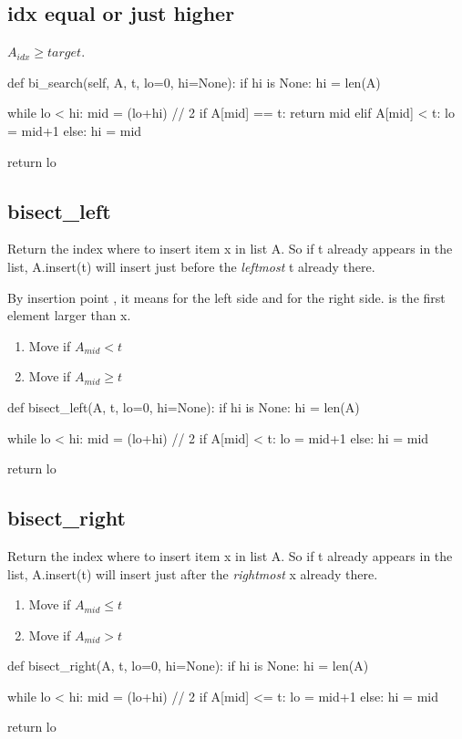 \subsection{idx equal or just higher}
$A_{idx} \geq target$.
\begin{python}
def bi_search(self, A, t, lo=0, hi=None):
    if hi is None: hi = len(A)
   
    while lo < hi:
        mid = (lo+hi) // 2
        if A[mid] == t:  return mid
        elif A[mid] < t: lo = mid+1
        else:            hi = mid
        
    return lo
\end{python}
\subsection{bisect\_left}
Return the index where to insert item x in list A. So if t already appears in the list,
A.insert(t) will insert just before the \textit{leftmost} t already there.

By insertion point , it means  for the left side and  for the right side.  is the first element larger than x. 
\begin{enumerate}
\item Move  if $A_{mid} < t$
\item Move  if $A_{mid} \geq t$
\end{enumerate}

\begin{python}
def bisect_left(A, t, lo=0, hi=None):
    if hi is None: hi = len(A)

    while lo < hi:
        mid = (lo+hi) // 2
        if A[mid] < t:
            lo = mid+1   
        else:
            hi = mid

    return lo
\end{python}

\subsection{bisect\_right}
Return the index where to insert item x in list A. So if t already appears in the list, A.insert(t) will insert just after the \textit{rightmost} x already there.
\begin{enumerate}
\item Move  if $A_{mid} \leq t$
\item Move  if $A_{mid} > t$
\end{enumerate}
\begin{python}
def bisect_right(A, t, lo=0, hi=None):
    if hi is None: hi = len(A)

    while lo < hi:
        mid = (lo+hi) // 2
        if A[mid] <= t: 
            lo = mid+1
        else:
            hi = mid 

    return lo
\end{python}
